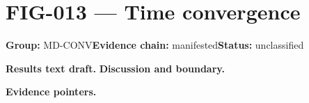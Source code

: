 \clearpage
\section{FIG-013 --- Time convergence}
\label{figpage:fig-013}
\textbf{Group:} MD-CONV\quad \textbf{Evidence chain:} manifested\quad \textbf{Status:} unclassified

\textbf{Results text draft.} 
\textbf{Discussion and boundary.} 


\textbf{Evidence pointers.}



\vfill
